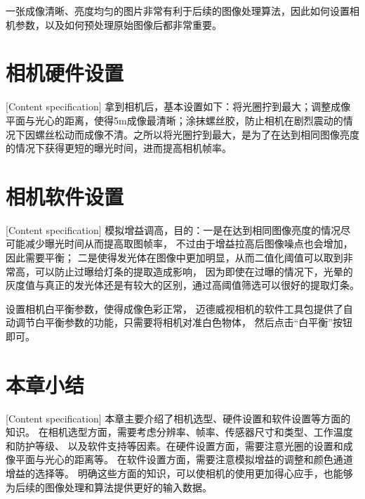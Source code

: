 一张成像清晰、亮度均匀的图片非常有利于后续的图像处理算法，因此如何设置相机参数，以及如何预处理原始图像后都非常重要。
\section{相机硬件设置}[Content specification]
拿到相机后，基本设置如下：将光圈拧到最大；调整成像平面与光心的距离，使得5m成像最清晰；涂抹螺丝胶，防止相机在剧烈震动的情况下因螺丝松动而成像不清。之所以将光圈拧到最大，是为了在达到相同图像亮度的情况下获得更短的曝光时间，进而提高相机帧率。
\section{相机软件设置}[Content specification]
模拟增益调高，目的：一是在达到相同图像亮度的情况尽可能减少曝光时间从而提高取图帧率，
不过由于增益拉高后图像噪点也会增加，因此需要平衡； 
二是使得发光体在图像中更加明显，从而二值化阈值可以取到非常高，可以防止过曝给灯条的提取造成影响，
因为即使在过曝的情况下，光晕的灰度值与真正的发光体还是有较大的区别，通过高阈值筛选可以很好的提取灯条。

设置相机白平衡参数，使得成像色彩正常，
迈德威视相机的软件工具包提供了自动调节白平衡参数的功能，只需要将相机对准白色物体，
然后点击“白平衡”按钮即可。

\section{本章小结}[Content specification]
本章主要介绍了相机选型、硬件设置和软件设置等方面的知识。
在相机选型方面，需要考虑分辨率、帧率、传感器尺寸和类型、工作温度和防护等级、
以及软件支持等因素。在硬件设置方面，需要注意光圈的设置和成像平面与光心的距离等。
在软件设置方面，需要注意模拟增益的调整和颜色通道增益的选择等。
明确这些方面的知识，可以使相机的使用更加得心应手，也能够为后续的图像处理和算法提供更好的输入数据。
